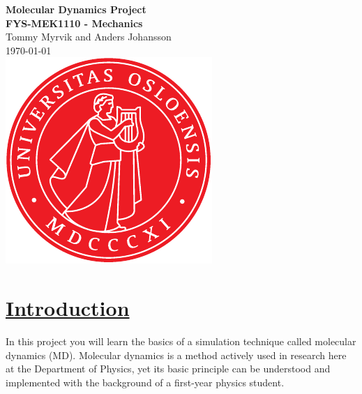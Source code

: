 \documentclass[11pt,british,a4paper]{report}
\begin{document}

\begin{titlepage}
\vspace*{\fill}
\begin{center}
\textsf{
    \Huge \textbf{Molecular Dynamics Project}\\\vspace{0.5cm}
    \Large \textbf{FYS-MEK1110 - Mechanics}\\
    \vspace{8cm}
    Tommy Myrvik and Anders Johansson\\
    \today\\
}
\vspace{1.5cm}
\includegraphics{uio.pdf}\\
\vspace*{\fill}
\end{center}
\end{titlepage}
\null
\pagestyle{empty}
\newpage

\pagestyle{fancy}
\setcounter{page}{1}


\section{\underline{Introduction}}
In this project you will learn the basics of a simulation technique called molecular dynamics (MD). Molecular dynamics is a method actively used in research here at the Department of Physics, yet its basic principle can be understood and implemented with the background of a first-year physics student.
\end{document}
